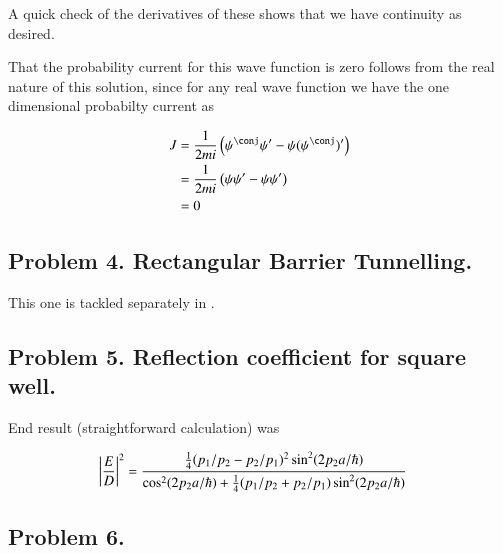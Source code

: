 \documentclass{article}
\begin{document}
A quick check of the derivatives of these shows that we have continuity as desired.

That the probability current for this wave function is zero follows from the real nature of this solution, since for any real
wave function we have the one dimensional probabilty current as

\begin{align*}
J 
&= \inv{2mi}\left( \psi^\conj \psi' - \psi (\psi^\conj)' \right) \\
&= \inv{2mi}\left( \psi \psi' - \psi \psi' \right) \\
&= 0
\end{align*}

\subsection{ Problem 4. Rectangular Barrier Tunnelling. }

This one is tackled separately in \cite{PJqmBarrier}.

\subsection{ Problem 5. Reflection coefficient for square well. }

End result (straightforward calculation) was

\begin{align*}
\left\lvert{\frac{E}{D}}\right\rvert^2 &= \frac{\frac{1}{4}(p_1/p_2 - p_2/p_1)^2 \sin^2( 2 p_2 a /\hbar)}{\cos^2(2 p_2 a/\hbar) + \frac{1}{4}(p_1/p_2 + p_2/p_1) \sin^2(2 p_2 a/\hbar)}
\end{align*}

\subsection{ Problem 6. }



\end{document}
